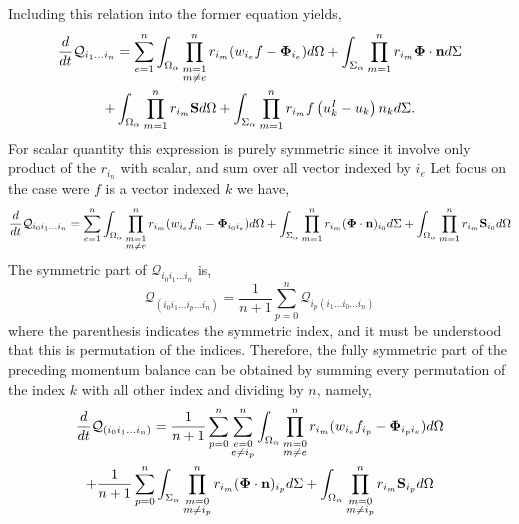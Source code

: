 Including this relation into the former equation yields, 
\begin{multline}
    \frac{d}{d t} {\mathcal{Q}_{i_1\ldots i_n}}
    = \sum_{e=1}^{n} \int_{\Omega_\alpha} \prod^{n}_{\substack{ m=1 \\   m \neq e}} r_{i_m} (w_{i_e}f  - \mathbf{\Phi}_{i_e})d\Omega
    +\int_{\Sigma_\alpha} \prod_{m=1}^{n} r_{i_m} \mathbf{\Phi} \cdot \textbf{n}d\Sigma\\
    + \int_{\Omega_\alpha} \prod_{m=1}^{n} r_{i_m} \textbf{S} d\Omega
    +\int_{\Sigma_\alpha} \prod_{m=1}^{n} r_{i_m} f \left(u^I_k - u_k\right) n_k d\Sigma.
    \label{eq:dt_Q_n}
\end{multline}
For scalar quantity this expression is purely symmetric since it involve only product of the $r_{i_n}$ with scalar, and sum over all vector indexed by $i_e$
Let focus on the case were $f$ is a vector indexed $k$ we have, 
\begin{multline}
    \frac{d}{d t} {\mathcal{Q}_{i_0 i_1\ldots i_n }}
    = \sum_{e=1}^{n} \int_{\Omega_\alpha} \prod^{n}_{\substack{ m=1 \\   m \neq e}} r_{i_m} (w_{i_e}f_{i_0}  - \mathbf{\Phi}_{i_0 i_e})d\Omega
    +\int_{\Sigma_\alpha} \prod_{m=1}^{n} r_{i_m} (\mathbf{\Phi} \cdot \textbf{n})_{i_0}d\Sigma
    + \int_{\Omega_\alpha} \prod_{m=1}^{n} r_{i_m} \textbf{S}_{i_0} d\Omega
\end{multline}
The symmetric part of $\mathcal{Q}_{i_0 i_1\ldots i_n}$ is, 
\begin{equation*}
    \mathcal{Q}_{(i_0 i_1\ldots i_p \ldots i_n )}
= \frac{1}{n+1}
\sum_{p=0}^{n} \mathcal{Q}_{i_p (i_1\ldots i_0\ldots i_n)}
\end{equation*}
where the parenthesis indicates the symmetric index, and it must be understood that this is permutation of the indices.  
Therefore, the fully symmetric part of the preceding momentum balance can be obtained by summing every permutation of the index $k$ with all other index and dividing by $n$, namely,
\begin{multline}
    \frac{d}{d t} {\mathcal{Q}_{(i_0 i_1\ldots i_n) }}
    = \frac{1}{n+1}
    \sum_{p=0}^{n}
    \sum_{\substack{ e=0 \\   e \neq i_p}}^{n} \int_{\Omega_\alpha} 
    \prod^{n}_{\substack{ m=0 \\   m \neq e}} r_{i_m} (w_{i_e}f_{i_p}  - \mathbf{\Phi}_{i_p i_e})d\Omega\\
    +\frac{1}{n+1}
    \sum_{p=0}^{n}
    \int_{\Sigma_\alpha} \prod^{n}_{\substack{ m=0 \\   m \neq i_p}} r_{i_m}
    (\mathbf{\Phi} \cdot \textbf{n})_{i_p}d\Sigma
    + \int_{\Omega_\alpha} 
    \prod^{n}_{\substack{ m=0 \\   m \neq i_p}} r_{i_m}
    \textbf{S}_{i_p} d\Omega
\end{multline}
